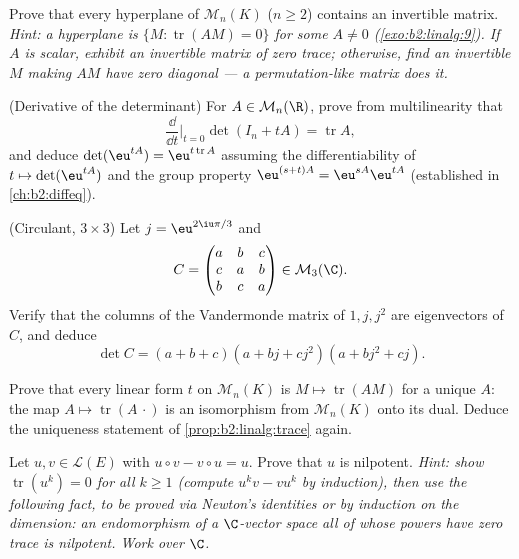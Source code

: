 \begin{exercise}[$\star\star$]\label{exo:b2:linalg:6}
Prove that every hyperplane of $\mathcal{M}_n(K)$ ($n \geq 2$)
contains an invertible matrix. \emph{Hint: a hyperplane is $\{M :
\operatorname{tr}(AM) = 0\}$ for some $A \neq 0$
(\cref{exo:b2:linalg:9}). If $A$ is scalar, exhibit an invertible
matrix of zero trace; otherwise, find an invertible $M$ making
$AM$ have zero diagonal --- a permutation-like matrix does it.}
\end{exercise}

\begin{exercise}[$\star\star$]\label{exo:b2:linalg:7}
(Derivative of the determinant) For $A \in \mathcal{M}_n(\R)$, prove
from multilinearity that
\[
\frac{\dd}{\dd t}\Big|_{t=0} \det(I_n + tA) = \operatorname{tr} A ,
\]
and deduce $\det(\eu^{tA}) = \eu^{t\operatorname{tr} A}$ assuming
the differentiability of $t \mapsto \det(\eu^{tA})$ and the group
property $\eu^{(s+t)A} = \eu^{sA}\eu^{tA}$ (established in
\cref{ch:b2:diffeq}).
\end{exercise}

\begin{exercise}[$\star\star$]\label{exo:b2:linalg:8}
(Circulant, $3 \times 3$) Let $j = \eu^{2\iu\pi/3}$ and
\[
C = \begin{pmatrix}
a & b & c\\
c & a & b\\
b & c & a
\end{pmatrix} \in \mathcal{M}_3(\C).
\]
Verify that the columns of the Vandermonde matrix of $1, j, j^2$ are
eigenvectors of $C$, and deduce
\[
\det C = (a + b + c)(a + bj + cj^2)(a + bj^2 + cj).
\]
\end{exercise}

\begin{exercise}[$\star\star\star$]\label{exo:b2:linalg:9}
Prove that every linear form $t$ on $\mathcal{M}_n(K)$ is $M \mapsto
\operatorname{tr}(AM)$ for a unique $A$: the map $A \mapsto
\operatorname{tr}(A\,\cdot)$ is an isomorphism from
$\mathcal{M}_n(K)$ onto its dual. Deduce the uniqueness statement of
\cref{prop:b2:linalg:trace} again.
\end{exercise}

\begin{exercise}[$\star\star\star$]\label{exo:b2:linalg:10}
Let $u, v \in \mathcal{L}(E)$ with $u \circ v - v \circ u = u$.
Prove that $u$ is nilpotent. \emph{Hint: show
$\operatorname{tr}(u^k) = 0$ for all $k \geq 1$ (compute $u^k v -
v u^k$ by induction), then use the following fact, to be proved via
Newton's identities or by induction on the dimension: an
endomorphism of a $\C$-vector space all of whose powers have zero
trace is nilpotent. Work over $\C$.}
\end{exercise}

